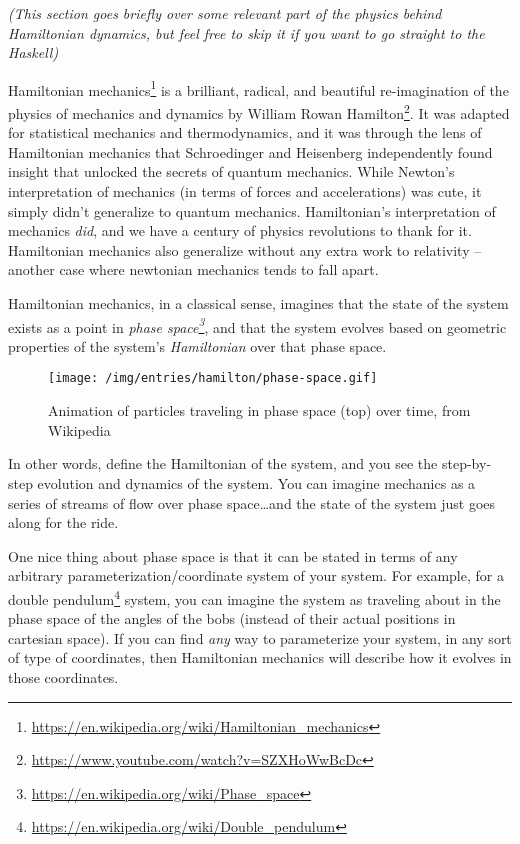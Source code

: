 \documentclass[]{article}
\renewcommand{\href}[2]{#2\footnote{\url{#1}}}
\begin{document}
\emph{(This section goes briefly over some relevant part of the physics behind
Hamiltonian dynamics, but feel free to skip it if you want to go straight to the
Haskell)}

\href{https://en.wikipedia.org/wiki/Hamiltonian_mechanics}{Hamiltonian
mechanics} is a brilliant, radical, and beautiful re-imagination of the physics
of mechanics and dynamics by
\href{https://www.youtube.com/watch?v=SZXHoWwBcDc}{William Rowan Hamilton}. It
was adapted for statistical mechanics and thermodynamics, and it was through the
lens of Hamiltonian mechanics that Schroedinger and Heisenberg independently
found insight that unlocked the secrets of quantum mechanics. While Newton's
interpretation of mechanics (in terms of forces and accelerations) was cute, it
simply didn't generalize to quantum mechanics. Hamiltonian's interpretation of
mechanics \emph{did}, and we have a century of physics revolutions to thank for
it. Hamiltonian mechanics also generalize without any extra work to relativity
-- another case where newtonian mechanics tends to fall apart.

Hamiltonian mechanics, in a classical sense, imagines that the state of the
system exists as a point in
\emph{\href{https://en.wikipedia.org/wiki/Phase_space}{phase space}}, and that
the system evolves based on geometric properties of the system's
\emph{Hamiltonian} over that phase space.

\begin{figure}
\centering
\texttt{[image: /img/entries/hamilton/phase-space.gif]}
\caption{Animation of particles traveling in phase space (top) over time, from
Wikipedia}
\end{figure}

In other words, define the Hamiltonian of the system, and you see the
step-by-step evolution and dynamics of the system. You can imagine mechanics as
a series of streams of flow over phase space\ldots{}and the state of the system
just goes along for the ride.

One nice thing about phase space is that it can be stated in terms of any
arbitrary parameterization/coordinate system of your system. For example, for a
\href{https://en.wikipedia.org/wiki/Double_pendulum}{double pendulum} system,
you can imagine the system as traveling about in the phase space of the angles
of the bobs (instead of their actual positions in cartesian space). If you can
find \emph{any} way to parameterize your system, in any sort of type of
coordinates, then Hamiltonian mechanics will describe how it evolves in those
coordinates.
\end{document}
